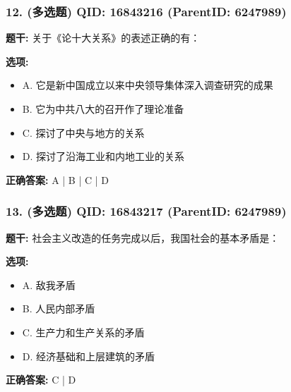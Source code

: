 \documentclass[12pt,UTF8]{ctexart}
\begin{document}
\subsubsection*{12. (多选题) \small QID: 16843216 (ParentID: 6247989)}

\textbf{题干:}
关于《论十大关系》的表述正确的有：



\textbf{选项:}
\begin{itemize}[leftmargin=*]

  \item A. 它是新中国成立以来中央领导集体深入调查研究的成果

  \item B. 它为中共八大的召开作了理论准备

  \item C. 探讨了中央与地方的关系

  \item D. 探讨了沿海工业和内地工业的关系

\end{itemize}

\textbf{正确答案:}
A | B | C | D

\vspace{0.3em}\hrulefill\vspace{0.7em}

\subsubsection*{13. (多选题) \small QID: 16843217 (ParentID: 6247989)}

\textbf{题干:}
社会主义改造的任务完成以后，我国社会的基本矛盾是：



\textbf{选项:}
\begin{itemize}[leftmargin=*]

  \item A. 敌我矛盾

  \item B. 人民内部矛盾

  \item C. 生产力和生产关系的矛盾

  \item D. 经济基础和上层建筑的矛盾

\end{itemize}

\textbf{正确答案:}
C | D

\vspace{0.3em}\hrulefill\vspace{0.7em}
\end{document}
